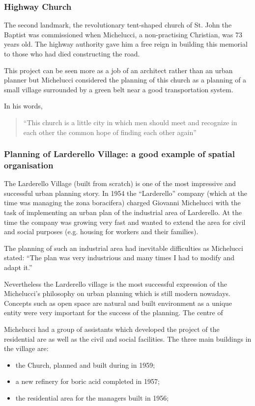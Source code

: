 \documentclass[a4paper,11pt]{article}
\begin{document}
\subsubsection*{Highway Church}
The second landmark, the revolutionary tent-shaped church of St. John the Baptist was commissioned when Michelucci, a non-practising Christian, was 73 years old. The highway authority gave him a free reign in building this memorial to those who had died constructing the road.

This project can be seen more as a job of an architect rather than an urban planner but Michelucci considered the planning of this church as a planning of a small village surrounded by a green belt near a good transportation system.

In his words,
\begin{quote}
``This church is a little city in which men should meet and recognize in each other the common hope of finding each other again''
\end{quote}

\subsubsection*{Planning of Larderello Village: a good example of spatial organisation}
The Larderello Village (built from scratch) is one of the most impressive and successful urban planning story.
In 1954 the ``Larderello'' company (which at the time was managing the zona boracifera) charged Giovanni Michelucci with the task of implementing an urban plan of the industrial area of Larderello. At the time the company was growing very fast and wanted to extend the area for civil and social purposes (e.g. housing for workers and their families).

The planning of such an industrial area had inevitable difficulties as Michelucci stated:
``The plan was very industrious and many times I had to modify and adapt it.''

Nevertheless the Larderello village is the most successful expression of the Michelucci's philosophy on urban planning which is still modern nowadays. Concepts such as open space are natural and built environment as a unique entity were very important for the success of the planning.
The centre of

Michelucci had a group of assistants which developed the project of the residential are as well as the civil and social facilities. The three main buildings in the village are:
\begin{itemize}
  \item the Church, planned and built during in 1959;
  \item a new refinery for boric acid completed in 1957;
  \item the residential area for the managers built in 1956;
\end{itemize}
\end{document}
